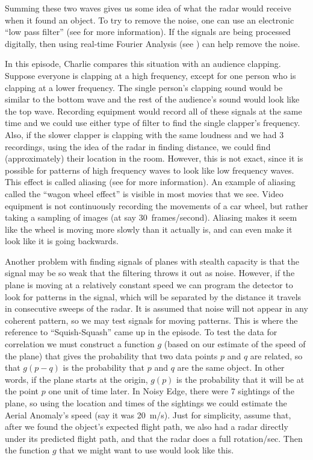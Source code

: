 Summing these two waves gives us some idea of what the radar would receive when it found an object. To try to remove the noise, one can use an electronic ``low pass filter'' (see  for more information). If the signals are being processed digitally, then using real-time Fourier Analysis (see ) can help remove the noise.


In this episode, Charlie compares this situation with an audience clapping. Suppose everyone is clapping at a high frequency, except for one person who is clapping at a lower frequency. The single person's clapping sound would be similar to the bottom wave and the rest of the audience's sound would look like the top wave. Recording equipment would record all of these signals at the same time and we could use either type of filter to find the single clapper's frequency. Also, if the slower clapper is clapping with the same loudness and we had 3 recordings, using the idea of the radar in finding distance, we could find (approximately) their location in the room. However, this is not exact, since it is possible for patterns of high frequency waves to look like low frequency waves. This effect is called aliasing (see  for more information). An example of aliasing called the ``wagon wheel effect'' is visible in most movies that we see. Video equipment is not continuously recording the movements of a car wheel, but rather taking a sampling of images (at say 30~frames/second). Aliasing makes it seem like the wheel is moving more slowly than it actually is, and can even make it look like it is going backwards.


Another problem with finding signals of planes with stealth capacity is that the signal may be so weak that the filtering throws it out as noise. However, if the plane is moving at a relatively constant speed we can program the detector to look for patterns in the signal, which will be separated by the distance it travels in consecutive sweeps of the radar. It is assumed that noise will not appear in any coherent pattern, so we may test signals for moving patterns. This is where the reference to ``Squish-Squash'' came up in the episode. To test the data for correlation we must construct a function $g$ (based on our estimate of the speed of the plane) that gives the probability that two data points $p$ and $q$ are related, so that $g(p-q)$ is the probability that $p$ and $q$ are the same object. In other words, if the plane starts at the origin, $g(p)$ is the probability that it will be at the point $p$ one unit of time later. In Noisy Edge, there were 7 sightings of the plane, so using the location and times of the sightings we could estimate the Aerial Anomaly's speed (say it was 20~m/s). Just for simplicity, assume that, after we found the object's expected flight path, we also had a radar directly under its predicted flight path, and that the radar does a full rotation/sec. Then the function $g$ that we might want to use would look like this. 


